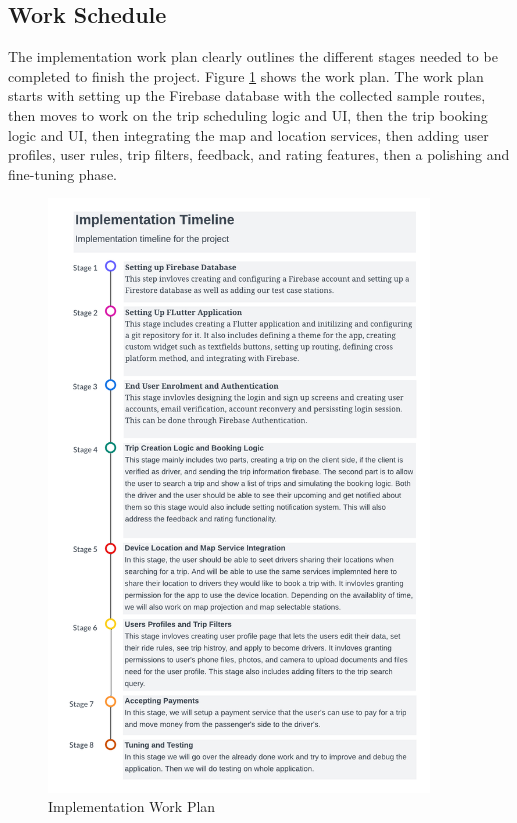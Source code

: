 \documentclass[a4paper, 12pt]{report} %
\begin{document}
        \subsection{Work Schedule}
            The implementation work plan clearly outlines the different stages needed to be completed to finish the project. Figure \ref{fig:work_plan} shows the work plan. The work plan starts with setting up the Firebase database with the collected sample routes, then moves to work on the trip scheduling logic and UI, then the trip booking logic and UI, then integrating the map and location services, then adding user profiles, user rules, trip filters, feedback, and rating features, then a polishing and fine-tuning phase.
            \begin{figure}[H]
                \centering
                \includegraphics[width=0.9\textwidth]{Images/implemntation_timeline.png}
                \caption{Implementation Work Plan}
                \label{fig:work_plan}
            \end{figure}
        
\end{document}
